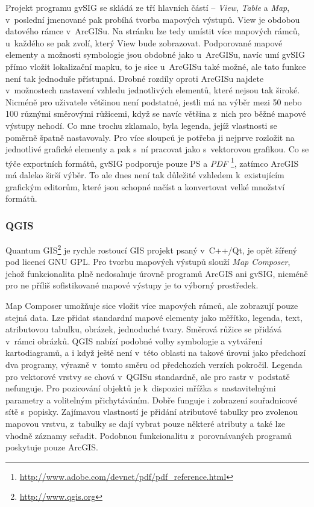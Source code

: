 \documentclass[a4paper,12pt,draft]{article}
\begin{document}
Projekt programu gvSIG se skládá ze tří hlavních částí -- \emph{View},
\emph{Table} a \emph{Map}, v~poslední jmenované pak probíhá tvorba
mapových výstupů. View je obdobou datového rámce v~ArcGISu. Na stránku
lze tedy umístit více mapových rámců, u~každého se pak zvolí,
který View bude zobrazovat. Podporované mapové elementy a možnosti
symbologie jsou obdobné
jako u~ArcGISu, navíc umí gvSIG přímo vložit lokalizační mapku,
to je sice u~ArcGISu také možné, ale tato funkce není tak jednoduše
přístupná. Drobné rozdíly oproti ArcGISu najdete v~možnostech nastavení
vzhledu
jednotlivých elementů, které nejsou tak široké. Nicméně pro uživatele
většinou
není podstatné, jestli má na výběr mezi 50 nebo 100 různými směrovými
růžicemi,
když se navíc  většina z~nich  pro běžné mapové výstupy nehodí.
Co mne trochu zklamalo,
byla legenda, jejíž vlastnosti se poměrně špatně nastavovaly. Pro
více sloupců je potřeba ji nejprve rozložit na jednotlivé grafické
elementy a pak s~ní pracovat jako s~vektorovou grafikou. Co se týče
exportních formátů, gvSIG podporuje pouze PS a \emph{PDF}%
\footnote{\url{http://www.adobe.com/devnet/pdf/pdf_reference.html}},
zatímco ArcGIS
má daleko širší výběr. To ale dnes není tak důležité vzhledem
k~existujícím grafickým editorům, které jsou schopné načíst a
konvertovat velké množství formátů.

\subsubsection{QGIS}
\label{sec:porovnani_moznosti:QGIS}
Quantum GIS\footnote{\url{http://www.qgis.org}} je rychle rostoucí GIS projekt
psaný v~C++/Qt, je opět šířený
pod licencí GNU GPL. Pro tvorbu mapových výstupů slouží \emph{Map
Composer}, jehož funkcionalita plně nedosahuje úrovně programů ArcGIS
ani gvSIG, nicméně pro ne příliš sofistikované mapové výstupy je to
výborný prostředek.

Map Composer umožňuje sice vložit více mapových rámců, ale
zobrazují pouze stejná data. Lze přidat standardní mapové elementy
jako měřítko, legenda, text, atributovou tabulku, obrázek, jednoduché
tvary. Směrová růžice se přidává v~rámci obrázků.
QGIS nabízí podobné volby symbologie a vytváření kartodiagramů,
a i když
ještě není v~této oblasti na takové úrovni jako předchozí dva
programy, výrazně
v~tomto směru od předchozích verzích pokročil.
Legenda pro vektorové vrstvy se chová v~QGISu standardně, ale
pro rastr v~podstatě nefunguje. Pro pozicování objektů je k~dispozici
mřížka s~nastavitelnými parametry a volitelným přichytáváním. Dobře
funguje i zobrazení souřadnicové sítě s~popisky. Zajímavou
vlastností je přidání atributové tabulky pro zvolenou mapovou
vrstvu, z~tabulky se dají vybrat pouze některé atributy a také lze
vhodně záznamy seřadit. Podobnou funkcionalitu z~porovnávaných programů
poskytuje pouze ArcGIS.
\end{document}
